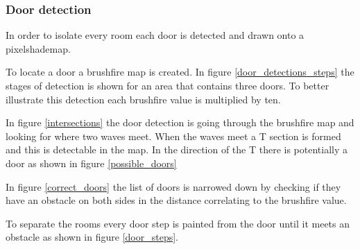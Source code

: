 \subsubsection{Door detection}
In order to isolate every room each door is detected and drawn onto a pixelshademap.

To locate a door a brushfire map is created. 
In figure \ref{door_detections_steps} the stages of detection is shown for an area that contains three doors.
To better illustrate this detection each brushfire value is multiplied by ten.

In figure \ref{intersections} the door detection is going through the brushfire map and looking for where two waves meet.
When the waves meet a T section is formed and this is detectable in the map. 
In the direction of the T there is potentially a door as shown in figure \ref{possible_doors}

In figure \ref{correct_doors} the list of doors is narrowed down by checking if they have an obstacle on both sides in the distance correlating to the brushfire value.

To separate the rooms every door step is painted from the door until it meets an obstacle as shown in figure \ref{door_steps}.

